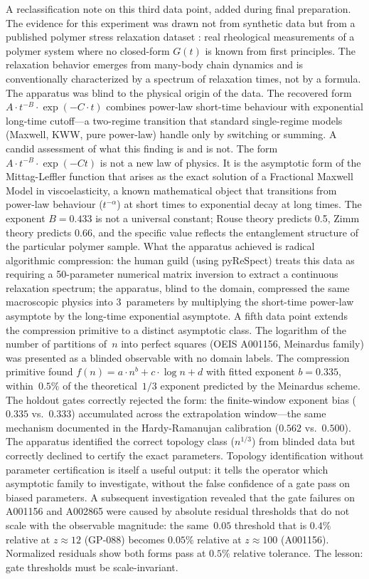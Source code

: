 \documentclass[11pt]{article}
\begin{document}
A reclassification note on this third data point, added during final preparation. The evidence for this experiment was drawn not from synthetic data but from a published polymer stress relaxation dataset \citep{shanbhag2019}: real rheological measurements of a polymer system where no closed-form $G(t)$ is known from first principles. The relaxation behavior emerges from many-body chain dynamics and is conventionally characterized by a spectrum of relaxation times, not by a formula. The apparatus was blind to the physical origin of the data. The recovered form $A \cdot t^{-B} \cdot \exp(-C \cdot t)$ combines power-law short-time behaviour with exponential long-time cutoff---a two-regime transition that standard single-regime models (Maxwell, KWW, pure power-law) handle only by switching or summing. A candid assessment of what this finding is and is not. The form $A \cdot t^{-B} \cdot \exp(-Ct)$ is not a new law of physics. It is the asymptotic form of the Mittag-Leffler function that arises as the exact solution of a Fractional Maxwell Model in viscoelasticity, a known mathematical object that transitions from power-law behaviour ($t^{-\alpha}$) at short times to exponential decay at long times. The exponent $B = 0.433$ is not a universal constant; Rouse theory predicts 0.5, Zimm theory predicts 0.66, and the specific value reflects the entanglement structure of the particular polymer sample. What the apparatus achieved is radical algorithmic compression: the human guild (using pyReSpect) treats this data as requiring a 50-parameter numerical matrix inversion to extract a continuous relaxation spectrum; the apparatus, blind to the domain, compressed the same macroscopic physics into 3~parameters by multiplying the short-time power-law asymptote by the long-time exponential asymptote. A fifth data point extends the compression primitive to a distinct asymptotic class. The logarithm of the number of partitions of~$n$ into perfect squares (OEIS A001156, Meinardus family) was presented as a blinded observable with no domain labels. The compression primitive found $f(n) = a \cdot n^b + c \cdot \log n + d$ with fitted exponent $b = 0.335$, within~$0.5\%$ of the theoretical~$1/3$ exponent predicted by the Meinardus scheme. The holdout gates correctly rejected the form: the finite-window exponent bias ($0.335$ vs.~$0.333$) accumulated across the extrapolation window---the same mechanism documented in the Hardy-Ramanujan calibration ($0.562$ vs.~$0.500$). The apparatus identified the correct topology class ($n^{1/3}$) from blinded data but correctly declined to certify the exact parameters. Topology identification without parameter certification is itself a useful output: it tells the operator which asymptotic family to investigate, without the false confidence of a gate pass on biased parameters. A subsequent investigation revealed that the gate failures on A001156 and A002865 were caused by absolute residual thresholds that do not scale with the observable magnitude: the same~$0.05$ threshold that is $0.4\%$ relative at $z \approx 12$ (GP-088) becomes $0.05\%$ relative at $z \approx 100$ (A001156). Normalized residuals show both forms pass at $0.5\%$ relative tolerance. The lesson: gate thresholds must be scale-invariant.
\end{document}
